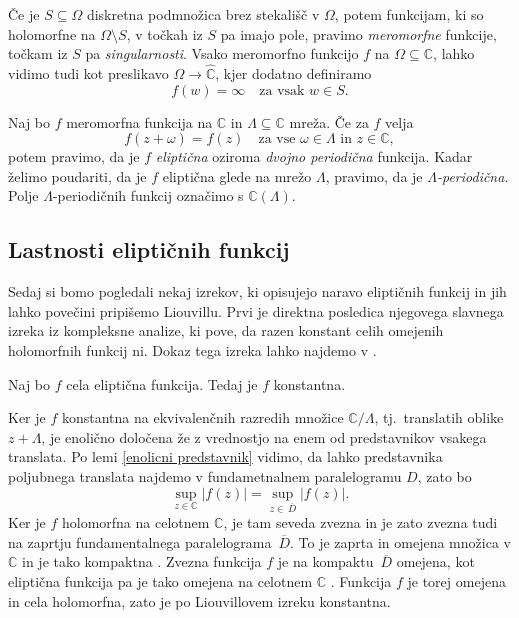 \documentclass[mat1]{fmfdelo}
\numberwithin{equation}{section}
\newcommand{\C}{\mathbb C}
\newcommand{\RS}{\widehat{\C}}
\newcommand{\om}{\omega}
\newcommand{\olsi}[1]{\,\overline{\!{#1}}} %
\newcommand{\tj}{tj.\ }
\theoremstyle{definition}
\begin{document}
Če je $S \subseteq \Omega$ diskretna podmnožica brez stekališč v $\Omega$, potem funkcijam, ki so holomorfne na $\Omega \setminus S$, v točkah iz $S$ pa imajo pole, pravimo \emph{meromorfne} funkcije, točkam iz $S$ pa \emph{singularnosti}. Vsako meromorfno funkcijo $f$ na $\Omega \subseteq \C$, lahko vidimo tudi kot preslikavo $\Omega \to \RS$, kjer dodatno definiramo 
\[
    f(w) = \infty \quad \text{za vsak $w \in S$.} 
\]

\begin{definicija}
    Naj bo $f$ meromorfna funkcija na $\C$ in $\Lambda \subseteq \C$ mreža. Če za $f$ velja
    \[
        f(z + \om) = f(z) \quad \text{za vse $\om \in \Lambda$ in $z \in \C$},
    \]
    potem pravimo, da je $f$ \emph{eliptična} oziroma \emph{dvojno periodična} funkcija. Kadar želimo poudariti, da je $f$ eliptična glede na mrežo $\Lambda$, pravimo, da je \emph{$\Lambda$-periodična}. Polje $\Lambda$-periodičnih funkcij označimo s $\C(\Lambda)$. %
\end{definicija}





\subsection{Lastnosti eliptičnih funkcij}

Sedaj si bomo pogledali nekaj izrekov, ki opisujejo naravo eliptičnih funkcij in jih lahko povečini pripišemo Liouvillu. Prvi je direktna posledica njegovega slavnega izreka iz kompleksne analize, ki pove, da razen konstant celih omejenih holomorfnih funkcij ni. Dokaz tega izreka lahko najdemo v \cite[izrek 59]{Globevnik}.

\begin{izrek}
    \label{cele el. funkcije}
    Naj bo $f$ cela eliptična funkcija. Tedaj je $f$ konstantna.
\end{izrek}

\begin{dokaz}
    Ker je $f$ konstantna na ekvivalenčnih razredih množice $\C/\Lambda$, \tj translatih oblike $z + \Lambda$, je enolično določena že z vrednostjo na enem od predstavnikov vsakega translata. Po lemi \ref{enolicni predstavnik} vidimo, da lahko predstavnika poljubnega translata najdemo v fundametnalnem paralelogramu $D$, zato bo 
    \[
        \sup_{z \in \C} \left\lvert f(z) \right\rvert = \sup_{z \in \olsi{D}} \left\lvert f(z) \right\rvert.
    \]
    Ker je $f$ holomorfna na celotnem $\C$, je tam seveda zvezna in je zato zvezna tudi na zaprtju fundamentalnega paralelograma $\olsi{D}$. To je zaprta in omejena množica v $\C$ in je tako kompaktna \cite[trditev 2.22]{MrcunTop}. Zvezna funkcija $f$ je na kompaktu $\olsi{D}$ omejena, kot eliptična funkcija pa je tako omejena na celotnem $\C$ \cite[posledica 2.28]{MrcunTop}. Funkcija $f$ je torej omejena in cela holomorfna, zato je po Liouvillovem izreku konstantna.  
\end{dokaz}
\end{document}

